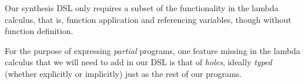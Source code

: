 \documentclass{article}
\begin{document}

Our synthesis DSL
only requires a subset of the functionality in the lambda calculus,
that is, function application and referencing variables,
though without function definition.

For the purpose of expressing \emph{partial} programs,
one feature missing in the lambda calculus that we will need to add in our DSL is that of \emph{holes},
ideally \emph{typed} (whether explicitly or implicitly) just as the rest of our programs.

\end{document}
